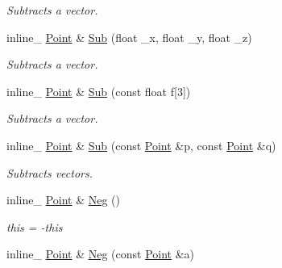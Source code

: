 \begin{DoxyCompactItemize}
\begin{DoxyCompactList}\small\item\em Subtracts a vector. \end{DoxyCompactList}\item 
inline\+\_\+ \hyperlink{classOpcode_1_1Point}{Point} \& \hyperlink{classOpcode_1_1Point_a9cbc311377c65417b0dbcfa6fce3f969}{Sub} (float \+\_\+x, float \+\_\+y, float \+\_\+z)\hypertarget{classOpcode_1_1Point_a9cbc311377c65417b0dbcfa6fce3f969}{}\label{classOpcode_1_1Point_a9cbc311377c65417b0dbcfa6fce3f969}

\begin{DoxyCompactList}\small\item\em Subtracts a vector. \end{DoxyCompactList}\item 
inline\+\_\+ \hyperlink{classOpcode_1_1Point}{Point} \& \hyperlink{classOpcode_1_1Point_a729e36c4e8f04f39edf376b9ac26cfe7}{Sub} (const float f\mbox{[}3\mbox{]})\hypertarget{classOpcode_1_1Point_a729e36c4e8f04f39edf376b9ac26cfe7}{}\label{classOpcode_1_1Point_a729e36c4e8f04f39edf376b9ac26cfe7}

\begin{DoxyCompactList}\small\item\em Subtracts a vector. \end{DoxyCompactList}\item 
inline\+\_\+ \hyperlink{classOpcode_1_1Point}{Point} \& \hyperlink{classOpcode_1_1Point_abae04e2beee9f2291d71400c3f283824}{Sub} (const \hyperlink{classOpcode_1_1Point}{Point} \&p, const \hyperlink{classOpcode_1_1Point}{Point} \&q)\hypertarget{classOpcode_1_1Point_abae04e2beee9f2291d71400c3f283824}{}\label{classOpcode_1_1Point_abae04e2beee9f2291d71400c3f283824}

\begin{DoxyCompactList}\small\item\em Subtracts vectors. \end{DoxyCompactList}\item 
inline\+\_\+ \hyperlink{classOpcode_1_1Point}{Point} \& \hyperlink{classOpcode_1_1Point_a4a1fab25037dc8eaaa85cc5c1355197b}{Neg} ()\hypertarget{classOpcode_1_1Point_a4a1fab25037dc8eaaa85cc5c1355197b}{}\label{classOpcode_1_1Point_a4a1fab25037dc8eaaa85cc5c1355197b}

\begin{DoxyCompactList}\small\item\em this = -\/this \end{DoxyCompactList}\item 
inline\+\_\+ \hyperlink{classOpcode_1_1Point}{Point} \& \hyperlink{classOpcode_1_1Point_a0ac49a9121be982ad7634912b03aca3d}{Neg} (const \hyperlink{classOpcode_1_1Point}{Point} \&a)\hypertarget{classOpcode_1_1Point_a0ac49a9121be982ad7634912b03aca3d}{}\label{classOpcode_1_1Point_a0ac49a9121be982ad7634912b03aca3d}


\end{DoxyCompactItemize}
